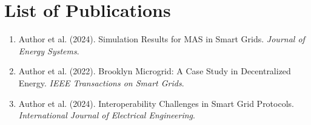 \documentclass[12pt, a4paper, oneside]{book}
\begin{document}
\chapter*{List of Publications}
\begin{enumerate}
    \item Author et al. (2024). Simulation Results for MAS in Smart Grids. \textit{Journal of Energy Systems}.
    \item Author et al. (2022). Brooklyn Microgrid: A Case Study in Decentralized Energy. \textit{IEEE Transactions on Smart Grids}.
    \item Author et al. (2024). Interoperability Challenges in Smart Grid Protocols. \textit{International Journal of Electrical Engineering}.
\end{enumerate}
\end{document}
